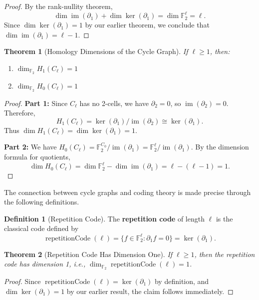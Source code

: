\documentclass[11pt]{article}
\theoremstyle{plain}
\newtheorem*{theorem}{Theorem}
\theoremstyle{definition}
\newtheorem*{definition}{Definition}
\theoremstyle{remark}
\renewcommand{\ker}{\operatorname{ker}}
\begin{document}
\begin{proof}
By the rank-nullity theorem,
\[
\dim\operatorname{im}(\partial_1) + \dim\ker(\partial_1) = \dim\mathbb{F}_2^\ell = \ell.
\]
Since $\dim\ker(\partial_1) = 1$ by our earlier theorem, we conclude that $\dim\operatorname{im}(\partial_1) = \ell - 1$.
\end{proof}

\begin{theorem}[Homology Dimensions of the Cycle Graph]
If $\ell \geq 1$, then:
\begin{enumerate}
\item $\dim_{\mathbb{F}_2} H_1(C_\ell) = 1$
\item $\dim_{\mathbb{F}_2} H_0(C_\ell) = 1$
\end{enumerate}
\end{theorem}

\begin{proof}
\textbf{Part 1:} Since $C_\ell$ has no 2-cells, we have $\partial_2 = 0$, so $\operatorname{im}(\partial_2) = 0$. Therefore,
\[
H_1(C_\ell) = \ker(\partial_1) / \operatorname{im}(\partial_2) \cong \ker(\partial_1).
\]
Thus $\dim H_1(C_\ell) = \dim\ker(\partial_1) = 1$.

\textbf{Part 2:} We have $H_0(C_\ell) = \mathbb{F}_2^{C_0} / \operatorname{im}(\partial_1) = \mathbb{F}_2^\ell / \operatorname{im}(\partial_1)$. By the dimension formula for quotients,
\[
\dim H_0(C_\ell) = \dim\mathbb{F}_2^\ell - \dim\operatorname{im}(\partial_1) = \ell - (\ell - 1) = 1.
\]
\end{proof}

The connection between cycle graphs and coding theory is made precise through the following definitions.

\begin{definition}[Repetition Code]
The \textbf{repetition code} of length $\ell$ is the classical code defined by
\[
\operatorname{repetitionCode}(\ell) = \{f \in \mathbb{F}_2^\ell : \partial_1 f = 0\} = \ker(\partial_1).
\]
\end{definition}

\begin{theorem}[Repetition Code Has Dimension One]
If $\ell \geq 1$, then the repetition code has dimension 1, i.e., $\dim_{\mathbb{F}_2} \operatorname{repetitionCode}(\ell) = 1$.
\end{theorem}

\begin{proof}
Since $\operatorname{repetitionCode}(\ell) = \ker(\partial_1)$ by definition, and $\dim\ker(\partial_1) = 1$ by our earlier result, the claim follows immediately.
\end{proof}
\end{document}

